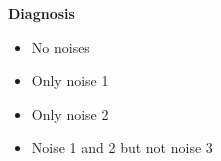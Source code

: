 \documentclass[a4paper]{scrartcl}
\begin{document}
\begin{enumerate}
\begin{landscape}
		\end{landscape} 
		
		
		
		\textbf{Diagnosis}
			\begin{itemize}
				\item No noises
				
				\item Only noise 1
				
				\item Only noise 2
				
				\item Noise 1 and 2 but not noise 3
			\end{itemize}
		
		
	\end{enumerate}
\end{document}
